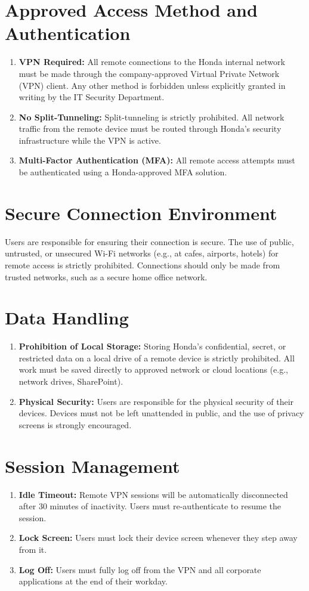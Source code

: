 \section{Approved Access Method and Authentication}
\begin{enumerate}
    \item \textbf{VPN Required:} All remote connections to the Honda internal network must be made through the company-approved Virtual Private Network (VPN) client. Any other method is forbidden unless explicitly granted in writing by the IT Security Department.
    \item \textbf{No Split-Tunneling:} Split-tunneling is strictly prohibited. All network traffic from the remote device must be routed through Honda's security infrastructure while the VPN is active.
    \item \textbf{Multi-Factor Authentication (MFA):} All remote access attempts must be authenticated using a Honda-approved MFA solution.
\end{enumerate}

\section{Secure Connection Environment}
Users are responsible for ensuring their connection is secure. The use of public, untrusted, or unsecured Wi-Fi networks (e.g., at cafes, airports, hotels) for remote access is strictly prohibited. Connections should only be made from trusted networks, such as a secure home office network.

\section{Data Handling}
\begin{enumerate}
    \item \textbf{Prohibition of Local Storage:} Storing Honda's confidential, secret, or restricted data on a local drive of a remote device is strictly prohibited. All work must be saved directly to approved network or cloud locations (e.g., network drives, SharePoint).
    \item \textbf{Physical Security:} Users are responsible for the physical security of their devices. Devices must not be left unattended in public, and the use of privacy screens is strongly encouraged.
\end{enumerate}

\section{Session Management}
\begin{enumerate}
    \item \textbf{Idle Timeout:} Remote VPN sessions will be automatically disconnected after 30 minutes of inactivity. Users must re-authenticate to resume the session.
    \item \textbf{Lock Screen:} Users must lock their device screen whenever they step away from it.
    \item \textbf{Log Off:} Users must fully log off from the VPN and all corporate applications at the end of their workday.
\end{enumerate}
